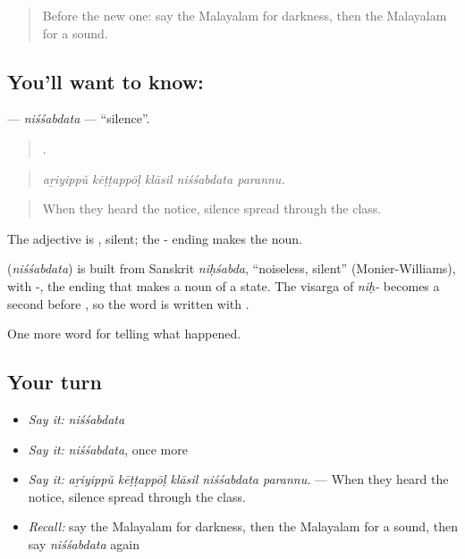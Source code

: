 \label{lesson:ML-C381-nissabdata}



\begin{quote}
Before the new one: say the Malayalam for darkness, then the Malayalam for a sound.
\end{quote}

\subsection*{You'll want to know: }
\textbf{} — \emph{niśśabdata} — \textquotedblleft{}silence\textquotedblright{}.

\begin{quote}
    .
\end{quote}

\begin{quote}
\emph{aṟiyippŭ kēṭṭappōḷ klāsil niśśabdata parannu.}
\end{quote}

\begin{quote}
When they heard the notice, silence spread through the class.
\end{quote}

The adjective is , silent; the - ending makes the noun.

\begin{cousinweb}
\textbf{} (\emph{niśśabdata}) is built from Sanskrit \emph{niḥśabda}, \textquotedblleft{}noiseless, silent\textquotedblright{} (Monier-Williams), with -, the ending that makes a noun of a state. The visarga of \emph{niḥ-} becomes a second  before , so the word is written with .
\end{cousinweb}

\begin{grammarlens}[title={What you've built}]
One more word for telling what happened.
\end{grammarlens}

\subsection*{Your turn}
\begin{itemize}
\raggedright
  \item \emph{Say it:} \emph{niśśabdata}
  \item \emph{Say it:} \emph{niśśabdata}, once more
  \item \emph{Say it:} \emph{aṟiyippŭ kēṭṭappōḷ klāsil niśśabdata parannu.} — When they heard the notice, silence spread through the class.
  \item \emph{Recall:} say the Malayalam for darkness, then the Malayalam for a sound, then say \emph{niśśabdata} again
\end{itemize}

